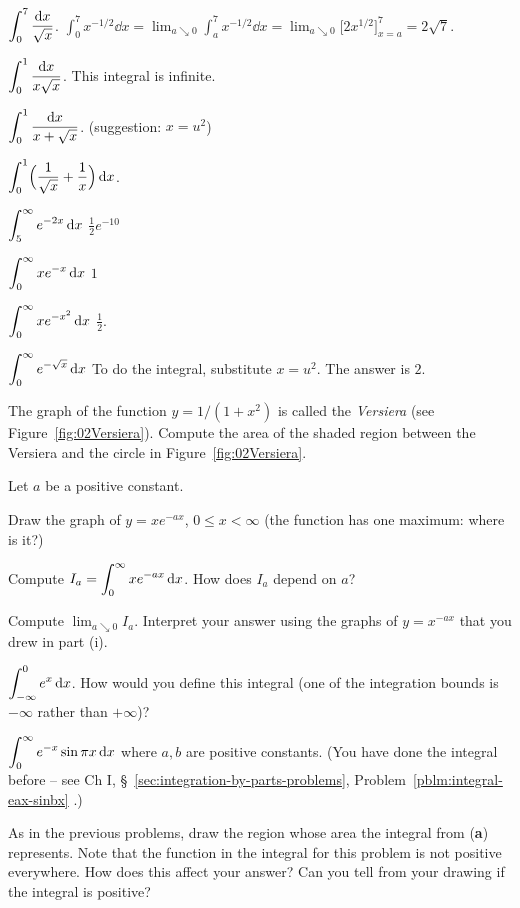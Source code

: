 \begin{multicols}{2}
\problem $\displaystyle \int_0^7 \frac{\mathrm{d} x} {\sqrt{x}}$. %
\answer %
$\int_0^7x^{-1/2}\dd x = \lim_{a\searrow 0}\int_a^7 x^{-1/2}\dd x
=\lim_{a\searrow0}\bigl[2x^{1/2}\bigr]_{x=a}^7 = 2\sqrt{7}.$
\endanswer

\problem $\displaystyle \int_0^1 \frac{\mathrm{d} x} {x\sqrt{x}}$. %
\answer %
This integral is infinite.
\endanswer

\problem $\displaystyle \int_0^1 \frac{\mathrm{d} x} {x+\sqrt{x}}$.\hfill %
(suggestion: $x=u^2$)

\problem $\displaystyle \int_0^1 \Bigl(\frac{1} {\sqrt{x}} + \frac{1} {x}\Bigr)\,\mathrm{d} x$. %

\problem $\displaystyle \int_5^\infty e^{-2x} \,\mathrm{d} x$ %
\answer %
$\frac12 e^{-10}$
\endanswer

\problem $\displaystyle \int_0^\infty x e^{-x}\,\mathrm{d} x$ %
\answer %
$1$
\endanswer

\problem $\displaystyle \int_0^\infty xe^{-x^2}\,\mathrm{d} x$ %
\answer %
$\frac12$.
\endanswer

\problem $\displaystyle \int_0^{\infty} e^{-\sqrt x}\,\mathrm{d} x$ %
\answer %
To do the integral, substitute $x=u^2$.  The answer is $2$.
\endanswer



\problem \label{pblm-area-under-Versiera} The graph of the function %
$y=1/(1+x^2)$ is called the \textit{Versiera} (see Figure~\ref{fig:02Versiera}).
Compute the area of the shaded region between the Versiera and the circle in
Figure~\ref{fig:02Versiera}.

\problem Let $a$ be a positive constant. %

\subprob  Draw the graph of $y=xe^{-ax}$, $0\leq x<\infty$ (the function has one
maximum: where is it?)

\subprob Compute $\displaystyle I_a = \int_0^\infty xe^{-ax}\,\mathrm{d} x$.  How does $I_a$
depend on $a$?

\subprob Compute $\lim_{a\searrow 0} I_a$.  Interpret your answer using the
graphs of $y=x^{-ax}$ that you drew in part (i).

\problem $\displaystyle \int_{-\infty}^0 e^x\, \mathrm{d} x$.  How would you define this integral %
(one of the integration bounds is $-\infty$ rather than $+\infty$)?

\problem \subprob $\displaystyle \int_0^\infty e^{-x}\sin \pi x\, \mathrm{d} x$ where $a,b$ are positive %
constants.  (You have done the integral before -- see Ch I,
\S~\ref{sec:integration-by-parts-problems},
Problem~\ref{pblm:integral-eax-sinbx} .)

\subprob\carefulnow   As in the previous problems,
draw the region whose area the integral from (\textbf{a}) represents.  Note that
the function in the integral for this problem is not positive everywhere.  How
does this affect your answer?  Can you tell from your drawing if the integral is
positive?  


\end{multicols}
